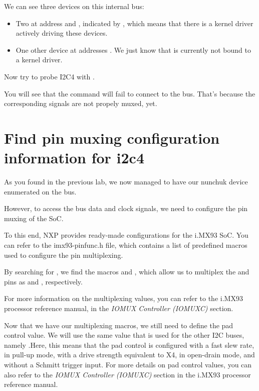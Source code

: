 We can see three devices on this internal bus:
\begin{itemize}
\item Two at address  and , indicated by ,
      which means that there is a kernel driver actively
      driving these devices.
\item One other device at addresses .
      We just know that is currently not bound to a kernel driver.
\end{itemize}

Now try to probe I2C4 with .

You will see that the command will fail to connect to
the bus. That's because the corresponding signals are
not propely muxed, yet.

\section{Find pin muxing configuration information for i2c4}

As you found in the previous lab, we now managed to have our nunchuk
device enumerated on the  bus.

However, to access the bus data and clock signals, we need to configure
the pin muxing of the SoC.

To this end, NXP provides ready-made configurations for the i.MX93 SoC.
You can refer to the imx93-pinfunc.h file, which contains a list of predefined macros used to configure the pin multiplexing.

By searching for , we find the macros  and , which allow us to multiplex the  and  pins as  and , respectively.

For more information on the multiplexing values, you can refer to the i.MX93 processor reference manual, in the
{\em IOMUX Controller (IOMUXC)} section.

Now that we have our multiplexing macros, we still need to define the pad control value.
We will use the same value that is used for the other I2C buses, namely .Here, this means that the pad control is configured with a fast slew rate, in pull-up mode, with a drive strength equivalent to X4, in open-drain mode, and without a Schmitt trigger input.
For more details on pad control values, you can also refer to the
{\em IOMUX Controller (IOMUXC)} section in the i.MX93 processor reference manual.

